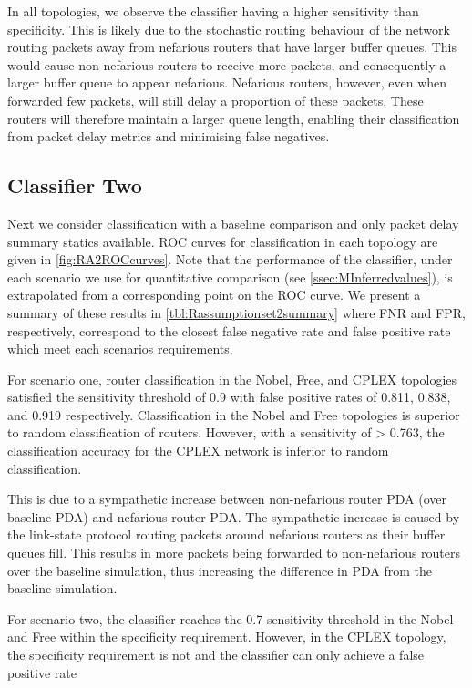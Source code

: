 In all topologies, we observe the classifier having a higher sensitivity than specificity. This is likely due to the stochastic routing behaviour of the network routing packets away from nefarious routers that have larger buffer queues. This would cause non-nefarious routers to receive more packets, and consequently a larger buffer queue to appear nefarious. Nefarious routers, however, even when forwarded few packets, will still delay a proportion of these packets. These routers will therefore maintain a larger queue length, enabling their classification from packet delay metrics and minimising false negatives.\par

\subsection{Classifier Two}
\label{ssec:Ras2}
Next we consider classification with a baseline comparison and only packet delay summary statics available. ROC curves for classification in each topology are given in \cref{fig:RA2ROCcurves}. Note that the performance of the classifier, under each scenario we use for quantitative comparison (see \cref{ssec:MInferredvalues}), is extrapolated from a corresponding point on the ROC curve. We present a summary of these results in \cref{tbl:Rassumptionset2summary} where FNR and FPR, respectively, correspond to the closest false negative rate and false positive rate which meet each scenarios requirements.\par
For scenario one, router classification in the Nobel, Free, and CPLEX topologies satisfied the sensitivity threshold of 0.9 with false positive rates of 0.811, 0.838, and 0.919 respectively. Classification in the Nobel and Free topologies is superior to random classification of routers. However, with a sensitivity of > 0.763, the classification accuracy for the CPLEX network is inferior to random classification.\par This is due to a sympathetic increase between non-nefarious router PDA (over baseline PDA) and nefarious router PDA. The sympathetic increase is caused by the link-state protocol routing packets around nefarious routers as their buffer queues fill. This results in more packets being forwarded to non-nefarious routers over the baseline simulation, thus increasing the difference in PDA from the baseline simulation.\par
For scenario two, the classifier reaches the 0.7 sensitivity threshold in the Nobel and Free within the specificity requirement. However, in the CPLEX topology, the specificity requirement is not and the classifier can only achieve a false positive rate
